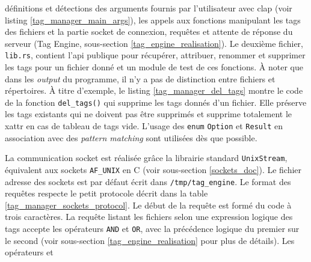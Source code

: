 définitions et détections des arguments fournis par l'utilisateur avec clap (voir listing 
\ref{tag_manager_main_args}), les appels aux fonctions 
manipulant les tags des fichiers et la partie socket de connexion, requêtes et attente 
de réponse du serveur (Tag Engine, sous-section \ref{tag_engine_realisation}). Le deuxième fichier, 
\texttt{lib.rs}, contient l'\acrshort{api} publique pour récupérer, attribuer, renommer 
et supprimer les tags pour un fichier donné et un module de test de ces fonctions. À noter que 
dans les \textit{output} du programme, il n'y a pas de distinction entre fichiers et répertoires.
À titre d'exemple, 
le listing \ref{tag_manager_del_tags} montre le code de la fonction \texttt{del_tags()} 
qui supprime les tags donnés d'un fichier. Elle préserve les tags existants qui ne doivent pas être 
supprimés et supprime totalement le \acrshort{xattr} en cas de tableau de tags vide. L'usage 
des \texttt{enum} \texttt{Option} et \texttt{Result} en association 
avec des \textit{pattern matching} sont utilisées dès que possible.
\bigbreak
{}
\bigbreak
\bigbreak
{}
\bigbreak
La communication socket est réalisée grâce la librairie standard \texttt{UnixStream}, 
équivalent aux sockets \texttt{AF_UNIX} en C (voir sous-section \ref{sockets_doc}). Le 
fichier adresse des sockets est par défaut écrit dans \texttt{/tmp/tag_engine}. Le format 
des requêtes respecte le petit protocole décrit dans la table \ref{tag_manager_sockets_protocol}. 
Le début de la requête est formé du code à trois caractères.
La requête listant les fichiers selon une expression logique des tags accepte les opérateurs 
\texttt{AND} et \texttt{OR}, avec la précédence logique du premier sur le 
second (voir sous-section \ref{tag_engine_realisation} pour plus de détails). Les opérateurs et 
